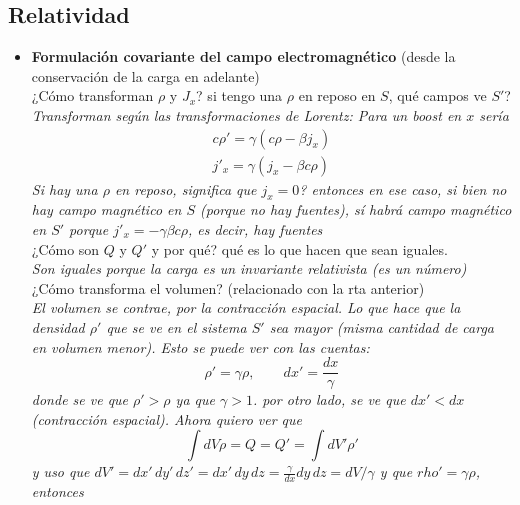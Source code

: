 \subsection*{Relatividad} 
\begin{itemize}
    \item \textbf{Formulación covariante del campo electromagnético} (desde la conservación de la carga en adelante)\\
    ¿Cómo transforman $\rho$ y $J_{x}$? si tengo una $\rho$ en reposo en $S$, qué campos ve $S'$?\\
    \textit{Transforman según las transformaciones de Lorentz: Para un boost en $x$ sería
    \begin{equation*}
        \begin{matrix}
            c\rho' = \gamma(c\rho - \beta j_{x})\\
            j'_{x} = \gamma(j_{x} - \beta c \rho)
        \end{matrix}
    \end{equation*}
    Si hay una $\rho$ en reposo, significa que $j_{x} = 0$? entonces en ese caso, si bien no hay campo magnético en $S$ (porque no hay fuentes), sí habrá campo magnético en $S'$ porque $j'_{x} = -\gamma\beta c \rho$, es decir, hay fuentes}\\
    ¿Cómo son $Q$ y $Q'$ y por qué? qué es lo que hacen que sean iguales. \\
    \textit{Son iguales porque la carga es un invariante relativista (es un número)}\\
    ¿Cómo transforma el volumen? (relacionado con la rta anterior)\\
    \textit{El volumen se contrae, por la contracción espacial. Lo que hace que la densidad $\rho'$ que se ve en el sistema $S'$ sea mayor (misma cantidad de carga en volumen menor). Esto se puede ver con las cuentas:}
    \begin{equation*}
        \rho' = \gamma \rho,
        \quad
        \quad
        dx' =  \frac{dx}{\gamma}
    \end{equation*}
    \textit{donde se ve que $\rho' > \rho$ ya que $\gamma > 1$. por otro lado, se ve que $dx' < dx$ (contracción espacial). Ahora quiero ver que}
    \begin{equation*}
        \int dV \rho = Q = Q' = \int dV' \rho'
    \end{equation*}
    \textit{y uso que $dV' = dx'\,dy'\,dz' = dx'\,dy\,dz = \frac{\gamma}{dx}dy\,dz = dV/\gamma$ y que $rho' = \gamma \rho$, entonces}
    \begin{equation*}

\end{equation*}
\end{itemize}
